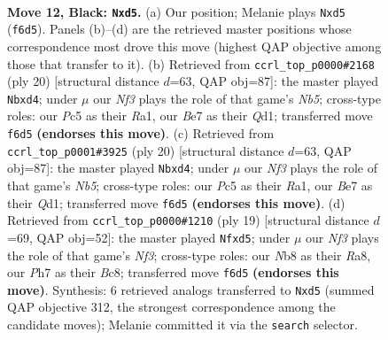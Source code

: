 \documentclass[11pt]{article}
\begin{document}
\clearpage

\begin{figure}[p]\centering
\begin{subfigure}{0.46\textwidth}\centering
\resizebox{\linewidth}{!}{%
\newchessgame
\chessboard[
  setfen={rnbr2k1/ppq1bppp/5n2/2pP4/P6P/3P1NP1/1P1N1PB1/R1BQ1RK1 b - - 0 12},
  showmover=false,
  pgfstyle=straightmove, color=movearrow, markmove={f6-d5}
]}
\caption{}
\end{subfigure}\hfill
\begin{subfigure}{0.46\textwidth}\centering
\resizebox{\linewidth}{!}{%
\newchessgame
\chessboard[
  setfen={r1bq1rk1/pp1nbppp/3p1n2/1N6/3p4/3B1N2/PPP2PPP/R1BQ1RK1 w - - 2 11},
  showmover=false,
  pgfstyle=straightmove, color=movearrow, markmove={b5-d4}
]}
\caption{}
\end{subfigure}
\\[4pt]
\begin{subfigure}{0.46\textwidth}\centering
\resizebox{\linewidth}{!}{%
\newchessgame
\chessboard[
  setfen={r1bq1rk1/pp1nbppp/3p1n2/1N6/3p4/3B1N2/PPP2PPP/R1BQ1RK1 w - - 2 11},
  showmover=false,
  pgfstyle=straightmove, color=movearrow, markmove={b5-d4}
]}
\caption{}
\end{subfigure}\hfill
\begin{subfigure}{0.46\textwidth}\centering
\resizebox{\linewidth}{!}{%
\newchessgame
\chessboard[
  setfen={r1bq1rk1/ppp1nppp/3b1n2/3Pp3/1P6/2PP1N2/P2NBPPP/R1BQR1K1 b - - 0 10},
  showmover=false,
  pgfstyle=straightmove, color=movearrow, markmove={f6-d5}
]}
\caption{}
\end{subfigure}
\caption{\textbf{Move 12, Black: \texttt{Nxd5}.} (a) Our position; Melanie plays \texttt{Nxd5} (\texttt{f6d5}). Panels (b)--(d) are the retrieved master positions whose correspondence most drove this move (highest QAP objective among those that transfer to it). (b) Retrieved from \texttt{ccrl\_top\_p0000\#2168} (ply 20) [structural distance $d$=63, QAP obj=87]: the master played \texttt{Nbxd4}; under $\mu$ our \emph{Nf3} plays the role of that game's \emph{Nb5}; cross-type roles: our \emph{P}c5 as their \emph{R}a1, our \emph{B}e7 as their \emph{Q}d1; transferred move \texttt{f6d5} \textbf{(endorses this move)}. (c) Retrieved from \texttt{ccrl\_top\_p0001\#3925} (ply 20) [structural distance $d$=63, QAP obj=87]: the master played \texttt{Nbxd4}; under $\mu$ our \emph{Nf3} plays the role of that game's \emph{Nb5}; cross-type roles: our \emph{P}c5 as their \emph{R}a1, our \emph{B}e7 as their \emph{Q}d1; transferred move \texttt{f6d5} \textbf{(endorses this move)}. (d) Retrieved from \texttt{ccrl\_top\_p0000\#1210} (ply 19) [structural distance $d$=69, QAP obj=52]: the master played \texttt{Nfxd5}; under $\mu$ our \emph{Nf3} plays the role of that game's \emph{Nf3}; cross-type roles: our \emph{N}b8 as their \emph{R}a8, our \emph{P}h7 as their \emph{B}c8; transferred move \texttt{f6d5} \textbf{(endorses this move)}. Synthesis: 6 retrieved analogs transferred to \texttt{Nxd5} (summed QAP objective 312, the strongest correspondence among the candidate moves); Melanie committed it via the \texttt{search} selector.}
\label{fig:thought-m23}
\end{figure}
\end{document}
